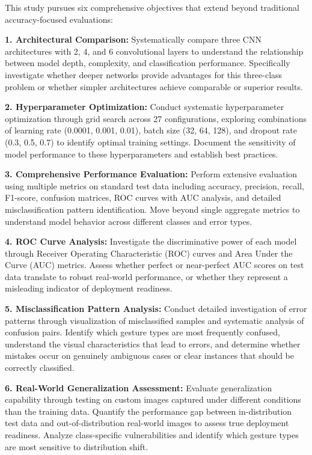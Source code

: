 \documentclass[12pt,a4paper]{article}
\begin{document}
This study pursues six comprehensive objectives that extend beyond traditional accuracy-focused evaluations:

\textbf{1. Architectural Comparison:} Systematically compare three CNN architectures with 2, 4, and 6 convolutional layers to understand the relationship between model depth, complexity, and classification performance. Specifically investigate whether deeper networks provide advantages for this three-class problem or whether simpler architectures achieve comparable or superior results.

\textbf{2. Hyperparameter Optimization:} Conduct systematic hyperparameter optimization through grid search across 27 configurations, exploring combinations of learning rate (0.0001, 0.001, 0.01), batch size (32, 64, 128), and dropout rate (0.3, 0.5, 0.7) to identify optimal training settings. Document the sensitivity of model performance to these hyperparameters and establish best practices.

\textbf{3. Comprehensive Performance Evaluation:} Perform extensive evaluation using multiple metrics on standard test data including accuracy, precision, recall, F1-score, confusion matrices, ROC curves with AUC analysis, and detailed misclassification pattern identification. Move beyond single aggregate metrics to understand model behavior across different classes and error types.

\textbf{4. ROC Curve Analysis:} Investigate the discriminative power of each model through Receiver Operating Characteristic (ROC) curves and Area Under the Curve (AUC) metrics. Assess whether perfect or near-perfect AUC scores on test data translate to robust real-world performance, or whether they represent a misleading indicator of deployment readiness.

\textbf{5. Misclassification Pattern Analysis:} Conduct detailed investigation of error patterns through visualization of misclassified samples and systematic analysis of confusion pairs. Identify which gesture types are most frequently confused, understand the visual characteristics that lead to errors, and determine whether mistakes occur on genuinely ambiguous cases or clear instances that should be correctly classified.

\textbf{6. Real-World Generalization Assessment:} Evaluate generalization capability through testing on custom images captured under different conditions than the training data. Quantify the performance gap between in-distribution test data and out-of-distribution real-world images to assess true deployment readiness. Analyze class-specific vulnerabilities and identify which gesture types are most sensitive to distribution shift.
\end{document}

